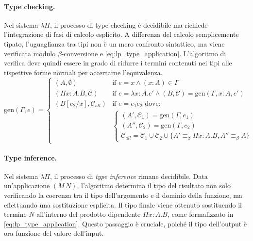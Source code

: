 \paragraph{Type checking.}
Nel sistema $\lambda \Pi$, il processo di type checking è decidibile ma richiede l'integrazione di fasi di calcolo esplicito. 
A differenza del calcolo semplicemente tipato, l'uguaglianza tra tipi non è un mero confronto sintattico, ma viene verificata 
modulo $\beta$-conversione e \eqref{eq:lp_type_application}. L'algoritmo di verifica deve quindi essere in grado di ridurre i 
termini contenuti nei tipi alle rispettive forme normali per accertarne l'equivalenza. 
\begin{equation}
    \text{gen}(\Gamma, e) =
    \begin{cases}
        (A, \emptyset) & \text{if } e = x \land (x : A) \in \Gamma \\
        (\Pi x : A. B, \mathcal{C}) & \text{if } e = \lambda x : A. e' \land (B, \mathcal{C}) = \text{gen}(\Gamma, x:A, e') \\
        (B[e_2/x], \mathcal{C}_{all}) & \text{if } e = e_1 e_2 \text{ dove:} \\ 
        & \begin{cases}
            (A', \mathcal{C}_1) = \text{gen}(\Gamma, e_1)   \\
            (A'', \mathcal{C}_2) = \text{gen}(\Gamma, e_2)  \\
            \mathcal{C}_{all} = \mathcal{C}_1 \cup \mathcal{C}_2 \cup \{A' \equiv_\beta \Pi x : A. B, A'' \equiv_\beta A\}
        \end{cases}
    \end{cases}
\end{equation}

\paragraph{Type inference.}
Nel sistema $\lambda\Pi$, il processo di \emph{type inference} rimane decidibile. Data un'applicazione $(M \, N)$, l'algoritmo determina 
il tipo del risultato non solo verificando la coerenza tra il tipo dell'argomento e il dominio della funzione, ma effettuando una sostituzione 
esplicita. Il tipo finale viene ottenuto sostituendo il termine $N$ all'interno del prodotto dipendente $\Pi x:A. B$, come formalizzato in 
\eqref{eq:lp_type_application}. Questo passaggio è cruciale, poiché il tipo dell'output è ora funzione del valore dell'input.

